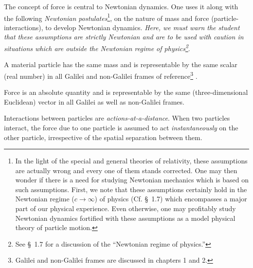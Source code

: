 The concept of force is central to Newtonian dynamics. 
One
uses it along with the following \textsl{Newtonian 
postulates}\footnote{In the light of the 
special and general theories of relativity, these 
assumptions are actually wrong and every one of them 
stands 
corrected. One may then wonder if there is a need for 
studying Newtonian mechanics which is based on such 
assumptions. First, we note that these assumptions 
certainly hold in the Newtonian regime ($c\rightarrow 
\infty$) of physics (Cf. \S~1.7) which encompasses a 
major 
part of our physical experience. Even otherwise, one 
may 
profitably study Newtonian dynamics fortified with 
these 
assumptions as a model physical theory of particle 
motion.}, 
on the nature of mass and force 
(particle-interactions), 
to develop Newtonian dynamics. 
\textsl{Here, we must warn the student that these 
assumptions are strictly Newtonian and are to be used 
with 
caution in situations which are outside the Newtonian 
regime 
of physics\footnote{See \S~1.7 for a discussion of the 
``Newtonian regime of physics.''}}.

 A material particle has 
the 
same mass and is representable by the same scalar 
(real 
number) in all Galilei and non-Galilei frames of 
reference\footnote{Galilei and non-Galilei frames are 
discussed in chapters 1 and 2.} . 

 Force is an absolute 
quantity 
and is representable by the same (three-dimensional 
Euclidean) vector in all Galilei as well as 
non-Galilei 
frames.

Interactions between particles are 
\textsl{actions-at-a-distance}. When two particles 
interact, 
the force due to one particle is assumed to act 
\textsl{instantaneously} on the other particle, 
irrespective 
of the spatial separation between them.

